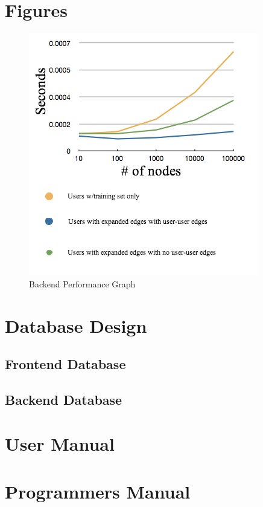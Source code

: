 \documentclass[11pt,letterpaper]{article}
\begin{document}
\section{Figures}
\begin{figure}
\centering
\includegraphics[scale=0.65]{img/recsys-performance-with-legend.png}
\caption{Backend Performance Graph}
\label{fig:test-performance}
\end{figure}



\section{Database Design}
\subsection{Frontend Database}
\subsection{Backend Database}

\section{User Manual}

\section{Programmers Manual}
\end{document}

